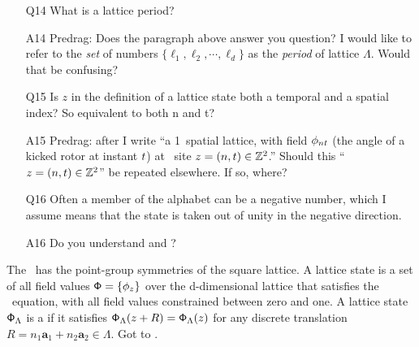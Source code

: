 \begin{description}
\begin{itemize}
	\item[Q14]
What is a lattice period?
	\item[A14]
Predrag: Does the paragraph above  answer you question?
I would like to refer to the \emph{set} of numbers
$\{\ell_1,\ell_2,\cdots,\ell_d\}$ as the \emph{period} of lattice
$\Lambda$. Would that be confusing?
	\item[Q15]
Is $z$ in the definition of a lattice state both a temporal and a spatial index? So equivalent to both n and t?
	\item[A15]
Predrag: after  I write ``a 1\dmn\ spatial
lattice, with field $\phi_{nt}$ (the angle of a kicked rotor
 at instant $t$) at \spt\ site
$z=(n,t)\in\mathbb{Z}^2$.'' Should this
``$z=(n,t)\in\mathbb{Z}^2$'' be repeated elsewhere. If so, where?
	\item[Q16]
Often a member of the alphabet can be a negative number, which I assume
means that the state is taken out of unity in the negative direction.
	\item[A16]
Do you understand  and ?
\end{itemize}

The
\catlatt\ has the point-group symmetries of the square lattice.
A lattice state is a set of all field values $\mathsf{\Phi}=\{\phi_z\}$ over the
d-dimensional lattice that satisfies the \catlatt\ equation,
with all field values constrained between zero and one. A lattice state
$\mathsf{\Phi}_{\Lambda}$ is a \emph{\twot} if it satisfies
$\mathsf{\Phi}_{\Lambda}(z+R)=\mathsf{\Phi}_{\Lambda}(z)$ for any
discrete translation $R=n_1\textbf{a}_1+n_2\textbf{a}_2 \in \Lambda$. Got
to .


\end{description}

